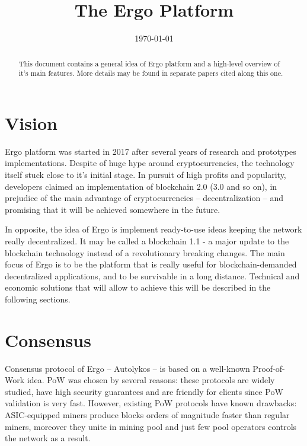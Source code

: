 \documentclass[]{article}
\begin{document}
    \title{The Ergo Platform}

    \date{\today}
    \maketitle

    \begin{abstract}
        This document contains a general idea of Ergo platform and a high-level overview of it's main features.
        More details may be found in separate papers cited along this one.
    \end{abstract}

    \section{Vision}

    Ergo platform was started in 2017 after several years of research and prototypes implementations.
    Despite of huge hype around cryptocurrencies, the technology itself stuck close to it's initial stage.
    In pursuit of high profits and popularity, developers claimed an implementation of blockchain 2.0 (3.0 and so on),
    in prejudice of the main advantage of cryptocurrencies -- decentralization -- and promising that it will be achieved
    somewhere in the future.

    In opposite, the idea of Ergo is implement ready-to-use ideas keeping the network really decentralized.
    It may be called a blockchain 1.1 - a major update to the blockchain technology instead of
    a revolutionary breaking changes.
    The main focus of Ergo is to be the platform that is really useful for blockchain-demanded
    decentralized applications, and to be survivable in a long distance.
    Technical and economic solutions that will allow to achieve this will be described in the following sections.

    \section{Consensus}

    Consensus protocol of Ergo -- Autolykos -- is based on a well-known Proof-of-Work idea.
    PoW was chosen by several reasons: these protocols are widely studied, have high security guarantees
    and are friendly for clients since PoW validation is very fast. %
    However, existing PoW protocols have known drawbacks: ASIC-equipped miners produce blocks
    orders of magnitude faster than regular miners, moreover
    they unite in mining pool and just few pool operators controls the network as a result.
\end{document}
